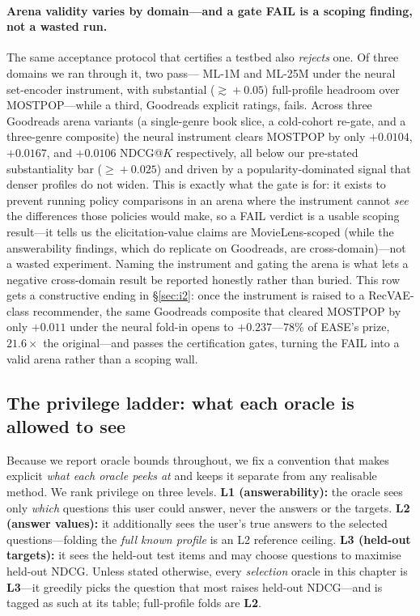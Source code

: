 \documentclass[11pt]{article}
\begin{document}
\paragraph{Arena validity varies by domain---and a gate FAIL is a scoping finding, not a wasted run.} The same
acceptance protocol that certifies a testbed also \emph{rejects} one. Of three domains we ran through it, two pass---
ML-1M and ML-25M under the neural set-encoder instrument, with substantial ($\gtrsim\!+0.05$) full-profile headroom over
MOSTPOP---while a third, Goodreads explicit ratings, fails. Across three Goodreads arena variants (a single-genre
book slice, a cold-cohort re-gate, and a three-genre composite) the neural instrument clears MOSTPOP by only
$+0.0104$, $+0.0167$, and $+0.0106$ NDCG@$K$ respectively, all below our pre-stated substantiality bar ($\ge\!+0.025$)
and driven by a popularity-dominated signal that denser profiles do not widen. This is exactly what the gate is for: it
exists to prevent running policy comparisons in an arena where the instrument cannot \emph{see} the differences those
policies would make, so a FAIL verdict is a usable scoping result---it tells us the elicitation-value claims are
MovieLens-scoped (while the answerability findings, which do replicate on Goodreads, are cross-domain)---not a wasted
experiment. Naming the instrument and gating the arena is what lets a negative cross-domain result be reported honestly
rather than buried. This row gets a constructive ending in \S\ref{sec:i2}: once the instrument is raised to a
RecVAE-class recommender, the same Goodreads composite that cleared MOSTPOP by only $+0.011$ under the neural fold-in
opens to $+0.237$---$78\%$ of EASE's prize, $21.6\times$ the original---and passes the certification gates, turning the
FAIL into a valid arena rather than a scoping wall.

\subsection{The privilege ladder: what each oracle is allowed to see}\label{sec:privladder}
Because we report oracle bounds throughout, we fix a convention that makes explicit \emph{what each oracle peeks at}
and keeps it separate from any realisable method. We rank privilege on three levels. \textbf{L1 (answerability):} the
oracle sees only \emph{which} questions this user could answer, never the answers or the targets. \textbf{L2 (answer
values):} it additionally sees the user's true answers to the selected questions---folding the \emph{full known
profile} is an L2 reference ceiling. \textbf{L3 (held-out targets):} it sees the held-out test items and may choose
questions to maximise held-out NDCG. Unless stated otherwise, every \emph{selection} oracle in this chapter is
\textbf{L3}---it greedily picks the question that most raises held-out NDCG---and is tagged as such at its table;
full-profile folds are \textbf{L2}.
\end{document}
